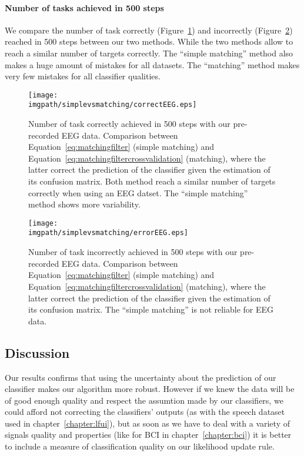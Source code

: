 \paragraph{Number of tasks achieved in 500 steps}

We compare the number of task correctly (Figure~\ref{fig:nCorrect_simplevsmatchingEEG}) and incorrectly (Figure~\ref{fig:nWrongEEG_simplevsmatchingEEG}) reached in 500 steps between our two methods. While the two methods allow to reach a similar number of targets correctly. The ``simple matching'' method also makes a huge amount of mistakes for all datasets. The ``matching'' method makes very few mistakes for all classifier qualities.

\begin{figure}[!htbp]
\centering
\texttt{[image: \\imgpath/simplevsmatching/correctEEG.eps]}
\caption{Number of task correctly achieved in 500 steps with our pre-recorded EEG data. Comparison between Equation~\ref{eq:matchingfilter} (simple matching) and Equation~\ref{eq:matchingfiltercrossvalidation} (matching), where the latter correct the prediction of the classifier given the estimation of its confusion matrix. Both method reach a similar number of targets correctly when using an EEG datset. The ``simple matching''  method shows more variability.}
\label{fig:nCorrect_simplevsmatchingEEG}
\end{figure} 

\begin{figure}[!htbp]
\centering
\texttt{[image: \\imgpath/simplevsmatching/errorEEG.eps]}
\caption{Number of task incorrectly achieved in 500 steps with our pre-recorded EEG data. Comparison between Equation~\ref{eq:matchingfilter} (simple matching) and Equation~\ref{eq:matchingfiltercrossvalidation} (matching), where the latter correct the prediction of the classifier given the estimation of its confusion matrix. The ``simple matching'' is not reliable for EEG data.}
\label{fig:nWrongEEG_simplevsmatchingEEG}
\end{figure} 

\subsection{Discussion}

Our results confirms that using the uncertainty about the prediction of our classifier makes our algorithm more robust. However if we knew the data will be of good enough quality and respect the assumtion made by our classifiers, we could afford not correcting the classifiers' outputs (as with the speech dataset used in chapter~\ref{chapter:lfui}), but as soon as we have to deal with a variety of signals quality and properties (like for BCI in chapter~\ref{chapter:bci}) it is better to include a measure of classification quality on our likelihood update rule.
